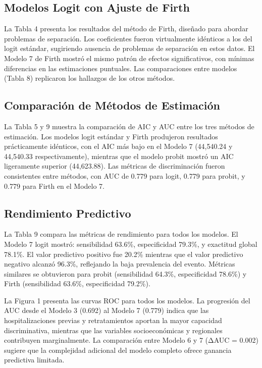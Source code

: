 \documentclass[
  spanish,
  10pt,
]{article}
\begin{document}
\subsection{Modelos Logit con Ajuste de
Firth}\label{modelos-logit-con-ajuste-de-firth}

La Tabla 4 presenta los resultados del método de Firth, diseñado para
abordar problemas de separación. Los coeficientes fueron virtualmente
idénticos a los del logit estándar, sugiriendo ausencia de problemas de
separación en estos datos. El Modelo 7 de Firth mostró el mismo patrón
de efectos significativos, con mínimas diferencias en las estimaciones
puntuales. Las comparaciones entre modelos (Tabla 8) replicaron los
hallazgos de los otros métodos.

\subsection{Comparación de Métodos de
Estimación}\label{comparaciuxf3n-de-muxe9todos-de-estimaciuxf3n}

La Tabla 5 y 9 muestra la comparación de AIC y AUC entre los tres
métodos de estimación. Los modelos logit estándar y Firth produjeron
resultados prácticamente idénticos, con el AIC más bajo en el Modelo 7
(44,540.24 y 44,540.33 respectivamente), mientras que el modelo probit
mostró un AIC ligeramente superior (44,623.88). Las métricas de
discriminación fueron consistentes entre métodos, con AUC de 0.779 para
logit, 0.779 para probit, y 0.779 para Firth en el Modelo 7.

\subsection{Rendimiento Predictivo}\label{rendimiento-predictivo}

La Tabla 9 compara las métricas de rendimiento para todos los modelos.
El Modelo 7 logit mostró: sensibilidad 63.6\%, especificidad 79.3\%, y
exactitud global 78.1\%. El valor predictivo positivo fue 20.2\%
mientras que el valor predictivo negativo alcanzó 96.3\%, reflejando la
baja prevalencia del evento. Métricas similares se obtuvieron para
probit (sensibilidad 64.3\%, especificidad 78.6\%) y Firth (sensibilidad
63.6\%, especificidad 79.2\%).

La Figura 1 presenta las curvas ROC para todos los modelos. La
progresión del AUC desde el Modelo 3 (0.692) al Modelo 7 (0.779) indica
que las hospitalizaciones previas y retratamientos aportan la mayor
capacidad discriminativa, mientras que las variables socioeconómicas y
regionales contribuyen marginalmente. La comparación entre Modelo 6 y 7
(ΔAUC = 0.002) sugiere que la complejidad adicional del modelo completo
ofrece ganancia predictiva limitada.
\end{document}
